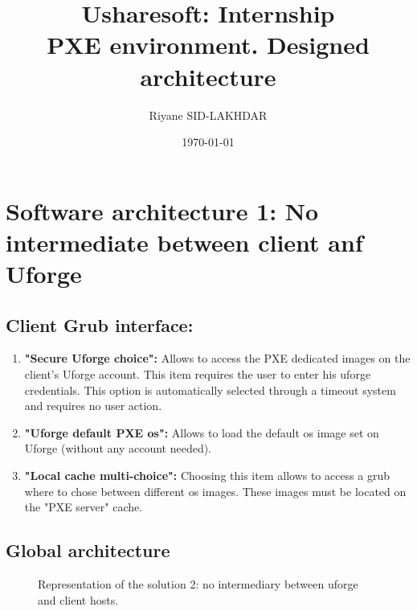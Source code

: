 \documentclass[12pt]{article}											%
\title{Usharesoft: Internship\\ PXE environment.   Designed architecture}
\author{Riyane SID-LAKHDAR}
\date{\today}
\begin{document}
\maketitle
\tableofcontents
\newpage




\section{Software architecture 1: No intermediate between client anf Uforge}
\subsection{Client Grub interface:}
	\begin{enumerate}
		\item \textbf{"Secure Uforge choice":} Allows to access the PXE dedicated images on the client's Uforge account.   This item requires the user to enter his uforge credentials.   This option is automatically selected through a timeout system and requires no user action.
		\item \textbf{"Uforge default PXE os":} Allows to load the default os image set on Uforge (without any account needed).\\
		\item \textbf{"Local cache multi-choice":} Choosing this item allows to access a grub where to chose between different os images.   These images must be located on the "PXE server" cache.
	\end{enumerate}


\subsection{Global architecture}

	\begin{figure}[t]
	\begin{center}
		\caption{Representation of the solution 2: no intermediary between uforge and client hosts.}
	\end{center}
	\end{figure}
\end{document}
